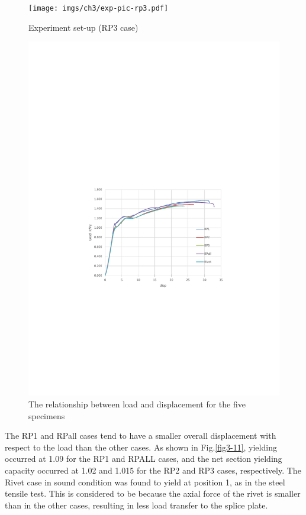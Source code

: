 \begin{figure}[htbp]
    \centering
    \begin{minipage}[t]{0.4\textwidth}
    \texttt{[image: imgs/ch3/exp-pic-rp3.pdf]}
    \caption{Experiment set-up (RP3 case)}
    \end{minipage}
    \begin{minipage}[t]{0.58\textwidth}
    \includegraphics[width=\linewidth]{imgs/ch3/fig3-10.pdf}
    \caption{The relationship between load and displacement for the five specimens}
    \label{fig-3-10}
    \end{minipage}
\end{figure}

The RP1 and RPall cases tend to have a smaller overall displacement with respect to the load than the other cases. As shown in Fig.\ref{fig3-11}, yielding occurred at 1.09 for the RP1 and RPALL cases, and the net section yielding capacity occurred at 1.02 and 1.015 for the RP2 and RP3 cases, respectively. The Rivet case in sound condition was found to yield at position 1, as in the steel tensile test. This is considered to be because the axial force of the rivet is smaller than in the other cases, resulting in less load transfer to the splice plate.


